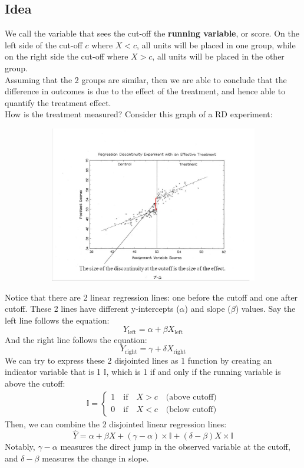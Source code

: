 \documentclass{article}
\begin{document}
\subsection{Idea}
We call the variable that sees the cut-off the \textbf{running variable}, or score. 
On the left side of the cut-off $c$ where $X<c$, all units will be placed in one group, while on the right side the cut-off where $X>c$, all units will be placed in the other group.
\\
Assuming that the 2 groups are similar, then we are able to conclude that the difference in outcomes is due to the effect of the treatment, and hence able to quantify the treatment effect.
\\
How is the treatment measured? 
Consider this graph of a RD experiment:
\begin{figure}[h!]
  \centering
  \begin{subfigure}{0.6\linewidth}
    \includegraphics[width=\linewidth]{RD.jpg}
  \end{subfigure} 
\end{figure}
Notice that there are 2 linear regression lines: one before the cutoff and one after cutoff.
These 2 lines have different y-intercepts ($\alpha$) and slope ($\beta$) values.
Say the left line follows the equation:
$$Y_{\text{left}} = \alpha + \beta X_{\text{left}}$$
And the right line follows the equation:
$$Y_{\text{right}} = \gamma + \delta X_{\text{right}}$$
We can try to express these 2 disjointed lines as 1 function by creating an indicator variable that is 1 $\mathbb{I}$, which is 1 if and only if the running variable is above the cutoff:
\begin{gather*}
        \mathbb{I} =
        \begin{cases}
            1 \quad \text{if} \quad X > c \quad \text{(above cutoff)} \\
            0 \quad \text{if} \quad X < c \quad \text{(below cutoff)}
        \end{cases}
\end{gather*}
Then, we can combine the 2 disjointed linear regression lines:
$$\hat{Y} = \alpha + \beta X + (\gamma - \alpha) \times \mathbb{I} + (\delta - \beta) X \times \mathbb{I}$$
Notably, $\gamma - \alpha$ measures the direct jump in the observed variable at the cutoff, and $\delta - \beta$ measures the change in slope.
\end{document}
